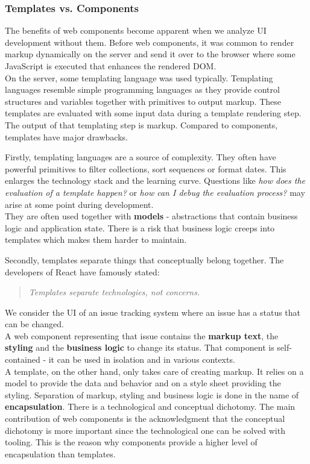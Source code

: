 \subsubsection{Templates vs. Components}
The benefits of web components become apparent when we analyze UI development without them. Before web components, it was common to render markup dynamically on the server and send it over to the browser where some \gls{JavaScript} is executed that enhances the rendered DOM. \\
On the server, some templating language was used typically. Templating languages resemble simple programming languages as they provide control structures and variables together with primitives to output markup. These templates are evaluated with some input data during a template rendering step. The output of that templating step is markup. Compared to components, templates have major drawbacks.

Firstly, templating languages are a source of complexity. They often have powerful primitives to filter collections, sort sequences or format dates. This enlarges the technology stack and the learning curve. Questions like \textit{how does the evaluation of a template happen?} or \textit{how can I debug the evaluation process?} may arise at some point during development. \\
They are often used together with \textbf{models} - abstractions that contain business logic and application state. There is a risk that business logic creeps into templates which makes them harder to maintain.

Secondly, templates separate things that conceptually belong together. The developers of React have famously stated:
\begin{quote}
\textit{Templates separate technologies, not concerns.}
\end{quote}
We consider the UI of an issue tracking system where an issue has a status that can be changed. \\ A web component representing that issue contains the \textbf{markup text}, the \textbf{styling} and the \textbf{business logic} to change its status. That component is self-contained - it can be used in isolation and in various contexts. \\
A template, on the other hand, only takes care of creating markup. It relies on a model to provide the data and behavior and on a style sheet providing the styling.
Separation of markup, styling and business logic is done in the name of \textbf{encapsulation}. There is a technological and conceptual dichotomy. The main contribution of web components is the acknowledgment that the conceptual dichotomy is more important since the technological one can be solved with tooling. This is the reason why components provide a higher level of encapsulation than templates.

